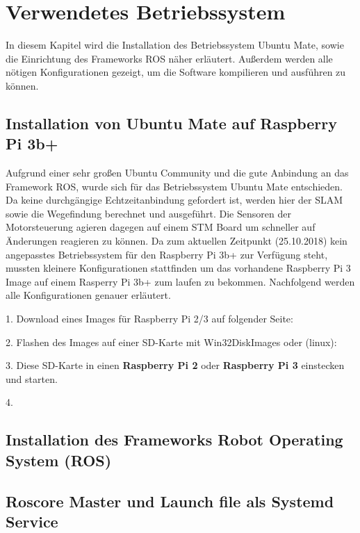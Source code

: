 \chapter{Verwendetes Betriebssystem}
In diesem Kapitel wird die Installation des Betriebssystem Ubuntu Mate, sowie die Einrichtung des Frameworks ROS näher erläutert. Außerdem werden alle nötigen Konfigurationen gezeigt, um die Software kompilieren und ausführen zu können. 


\section{Installation von Ubuntu Mate auf Raspberry Pi 3b+}
Aufgrund einer sehr großen Ubuntu Community und die gute Anbindung an das Framework ROS, wurde sich für das Betriebssystem Ubuntu Mate entschieden. Da keine durchgängige Echtzeitanbindung gefordert ist, werden hier der SLAM sowie die Wegefindung berechnet und ausgeführt. Die Sensoren der Motorsteuerung agieren dagegen auf einem STM Board um schneller auf Änderungen reagieren zu können. 
Da zum aktuellen Zeitpunkt (25.10.2018) kein angepasstes Betriebssystem für den Raspberry Pi 3b+ zur Verfügung steht, mussten kleinere Konfigurationen stattfinden um das vorhandene Raspberry Pi 3 Image auf einem Rasperry Pi 3b+ zum laufen zu bekommen. Nachfolgend werden alle Konfigurationen genauer erläutert. 

1. Download eines Images für Raspberry  Pi 2/3 auf folgender Seite:

2. Flashen des Images auf einer SD-Karte mit Win32DiskImages oder (linux):

3. Diese SD-Karte in einen \textbf{Raspberry Pi 2} oder \textbf{Raspberry Pi 3} einstecken und starten. 

4. 






\section{Installation des Frameworks Robot Operating System (ROS)}

\section{Roscore Master und Launch file als Systemd Service}